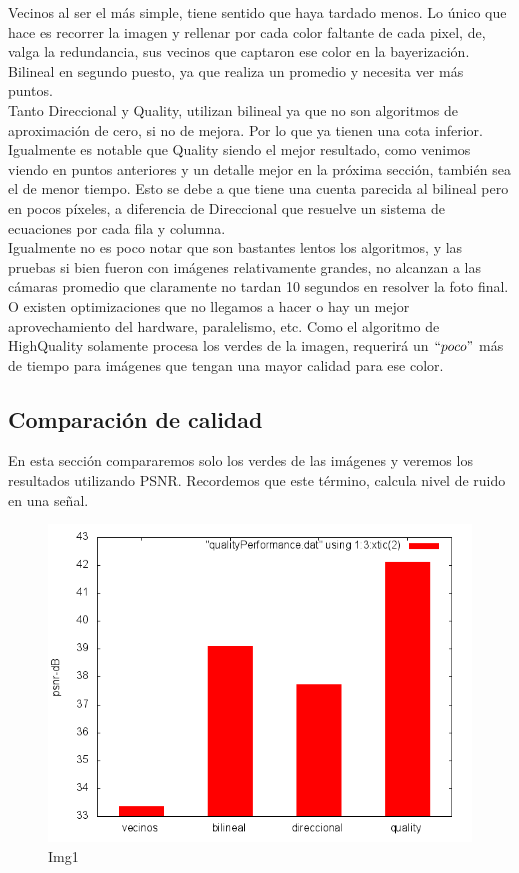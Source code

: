 Vecinos al ser el más simple, tiene sentido que haya tardado menos. Lo único que hace es recorrer la imagen y rellenar por cada color faltante de cada pixel, de, valga la redundancia, sus vecinos que captaron ese color en la bayerización. Bilineal en segundo puesto, ya que realiza un promedio y necesita ver más puntos. \\
Tanto Direccional y Quality, utilizan bilineal ya que no son algoritmos de aproximación de cero, si no de mejora. Por lo que ya tienen una cota inferior. Igualmente es notable que Quality siendo el mejor resultado, como venimos viendo en puntos anteriores y un detalle mejor en la próxima sección, también sea el de menor tiempo. Esto se debe a que tiene una cuenta parecida al bilineal pero en pocos píxeles, a diferencia de Direccional que resuelve un sistema de ecuaciones por cada fila y columna.\\
Igualmente no es poco notar que son bastantes lentos los algoritmos, y las pruebas si bien fueron con imágenes relativamente grandes, no alcanzan a las cámaras promedio que claramente no tardan 10 segundos en resolver la foto final. O existen optimizaciones que no llegamos a hacer o hay un mejor aprovechamiento del hardware, paralelismo, etc.
Como el algoritmo de HighQuality solamente procesa los verdes de la imagen, requerirá un $``poco"$ más de tiempo para imágenes que tengan una mayor calidad para ese color.




\subsection{Comparación de calidad}
En esta sección compararemos solo los verdes de las imágenes y veremos los resultados utilizando PSNR. Recordemos que este término, calcula nivel de ruido en una señal.

\begin{figure}[h]
       \includegraphics[scale=0.8]{imagenes/quality_performance.png}
       \caption{Img1}
\end{figure}

